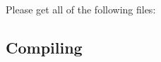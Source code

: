 Please get all of the following files:

\subsection{Compiling \periodname}%
\label{Compiling_Period}

